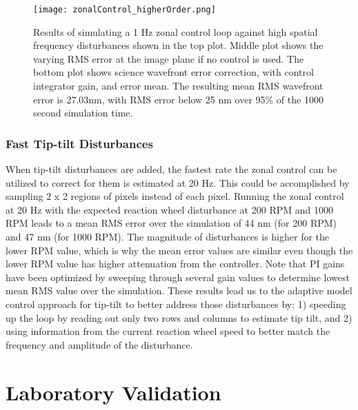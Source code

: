 \documentclass[]{spie}  %
\begin{document}
\begin{figure}[!h]
\centering
\texttt{[image: zonalControl\_higherOrder.png]}
\caption{\label{fig:zonalControl_higherOrder} Results of simulating a 1 Hz zonal control loop against high spatial frequency disturbances shown in the top plot. Middle plot shows the varying RMS error at the image plane if no control is used. The bottom plot shows science wavefront error correction, with control integrator gain, and error mean.  The resulting mean RMS wavefront error is 27.03nm, with RMS error below 25 nm over 95\% of the 1000 second simulation time. }
\end{figure}
\subsubsection{Fast Tip-tilt Disturbances}
When tip-tilt disturbances are added, the fastest rate the zonal control can be utilized to correct for them is estimated at 20 Hz. This could be accomplished by sampling 2 x 2 regions of pixels instead of each pixel. Running the zonal control at 20 Hz with the expected reaction wheel disturbance at 200 RPM and 1000 RPM leads to a mean RMS error over the simulation of 44 nm (for 200 RPM) and 47 nm (for 1000 RPM). The magnitude of disturbances is higher for the lower RPM value, which is why the mean error values are similar even though the lower RPM value has higher attenuation from the controller.  Note that PI gains have been optimized by sweeping through several gain values to determine lowest mean RMS value over the simulation.  These results lead us to the adaptive model control approach for tip-tilt to better address those disturbances by: 1) speeding up the loop by reading out only two rows and columns to estimate tip tilt,  and 2) using information from the current reaction wheel speed to better match the frequency and amplitude of the disturbance.

\section{Laboratory Validation}
\label{sec:lab_validation}
\end{document}
